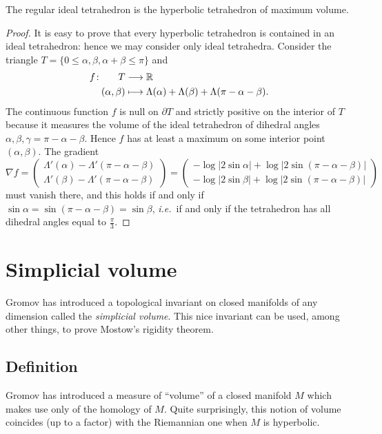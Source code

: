\begin{cor} \label{v3:cor}
The regular ideal tetrahedron is the hyperbolic tetrahedron of maximum volume.
\end{cor}
\begin{proof}
It is easy to prove that every hyperbolic tetrahedron is contained in an ideal tetrahedron: hence we may consider only ideal tetrahedra. Consider the triangle $T = \{0\leqslant \alpha, \beta, \alpha+\beta \leqslant \pi\}$ and 
\begin{align*}
f \colon \quad \ \ T & \longrightarrow  \mathbb{R} \\ 
(\alpha, \beta) & \longmapsto \Lambda(\alpha) + \Lambda(\beta) + \Lambda(\pi-\alpha-\beta).
\end{align*}
The continuous function $f$ is null on $\partial T$ and strictly positive on the interior of $T$ because it measures the volume of the ideal tetrahedron of dihedral angles $\alpha, \beta, \gamma = \pi-\alpha-\beta$. Hence $f$ has at least a maximum on some interior point $(\alpha,\beta)$. The gradient 
$$
\nabla f = \begin{pmatrix}
\Lambda'(\alpha) - \Lambda'(\pi - \alpha-\beta) \\ \Lambda'(\beta) - \Lambda'(\pi-\alpha-\beta) 
\end{pmatrix}
 =
\begin{pmatrix}
-\log |2\sin \alpha| + \log |2\sin (\pi-\alpha-\beta)| \\ 
-\log |2\sin \beta| + \log |2\sin (\pi-\alpha-\beta) |
\end{pmatrix}
$$
must vanish there, and this holds if and only if $\sin\alpha = \sin (\pi-\alpha-\beta) = \sin \beta$, \emph{i.e.}~if and only if the tetrahedron has all dihedral angles equal to $\frac \pi 3$.
\end{proof}


\section{Simplicial volume}

Gromov has introduced a topological invariant on closed manifolds of any dimension called the \emph{simplicial volume}. This nice invariant can be used, among other things, to prove Mostow's rigidity theorem.

\subsection{Definition}
Gromov has introduced a measure of ``volume'' of a closed manifold $M$ which makes use only of the homology of $M$. Quite surprisingly, this notion of volume coincides (up to a factor) with the Riemannian one when $M$ is hyperbolic. 

